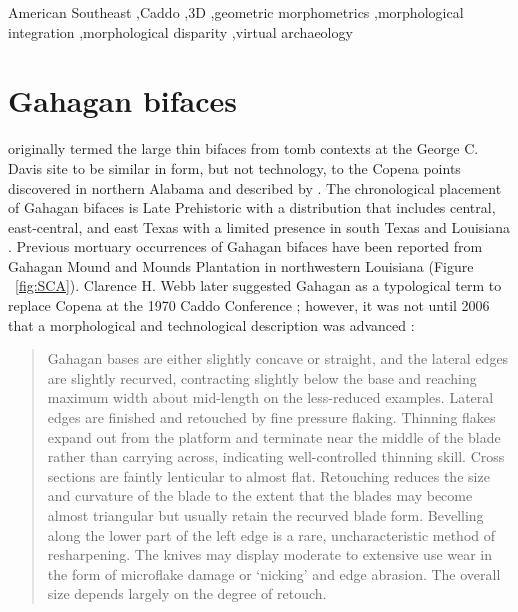 \documentclass[review]{elsarticle}
\begin{document}
\begin{frontmatter}
\begin{keyword}
American Southeast \sep Caddo \sep 3D \sep geometric morphometrics \sep morphological integration \sep morphological disparity \sep virtual archaeology
\end{keyword}

\end{frontmatter}

\linenumbers

\section{Gahagan bifaces}

\citet[173-174]{RN800} originally termed the large thin bifaces from tomb contexts at the George C. Davis site to be similar in form, but not technology, to the Copena points discovered in northern Alabama and described by \citet[301-306]{RN11562}. The chronological placement of Gahagan bifaces is Late Prehistoric with a distribution that includes central, east-central, and east Texas with a limited presence in south Texas and Louisiana \citep[230]{RN5629}. Previous mortuary occurrences of Gahagan bifaces have been reported from Gahagan Mound \citep{RN5274} and Mounds Plantation \citep{RN2740} in northwestern Louisiana (Figure ~\ref{fig:SCA}). Clarence H. Webb later suggested Gahagan as a typological term to replace Copena at the 1970 Caddo Conference \citep[229]{RN3682}; however, it was not until 2006 that a morphological and technological description was advanced \citep[22]{RN4924}:

\begin{quote}
Gahagan bases are either slightly concave or straight, and the lateral edges are slightly recurved, contracting slightly below the base and reaching maximum width about mid-length on the less-reduced examples. Lateral edges are finished and retouched by fine pressure flaking. Thinning flakes expand out from the platform and terminate near the middle of the blade rather than carrying across, indicating well-controlled thinning skill. Cross sections are faintly lenticular to almost flat. Retouching reduces the size and curvature of the blade to the extent that the blades may become almost triangular but usually retain the recurved blade form. Bevelling along the lower part of the left edge is a rare, uncharacteristic method of resharpening. The knives may display moderate to extensive use wear in the form of microflake damage or `nicking' and edge abrasion. The overall size depends largely on the degree of retouch.
\end{quote}
\end{document}
